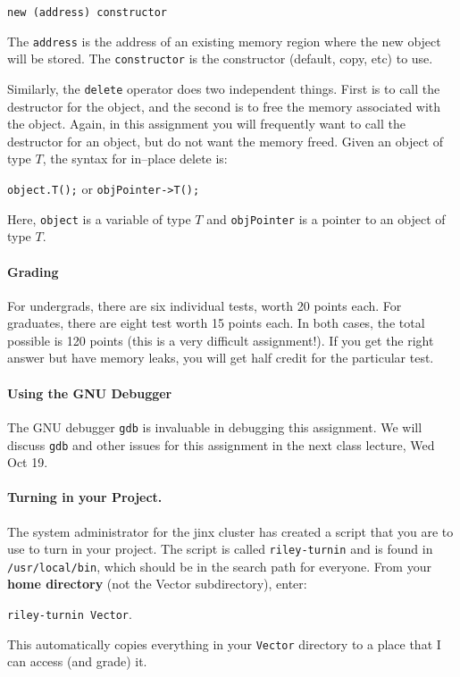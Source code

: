 \documentclass[10pt]{article}
\begin{document}
{\tt new (address) constructor}

The {\tt address} is the address of an existing memory region where
the new object will be stored.  The {\tt constructor} is the
constructor (default, copy, etc) to use.

Similarly, the {\tt delete} operator does two independent things.
First is to call the destructor for the object, and the second is to
free the memory associated with the object.  Again, in this assignment
you will frequently want to call the destructor for an object, but do not
want the memory freed.  Given an object of type $T$, the syntax for
in--place delete is:

{\tt object.T();}  or {\tt objPointer->T();}

Here, {\tt object} is a variable of type $T$ and {\tt objPointer}
is a pointer to an object of type $T$.


\paragraph{Grading}
For undergrads, there are six individual tests, worth 20 points each.
For graduates, there are eight test worth 15 points each. In both 
cases, the total possible is 120 points (this is a very difficult
assignment!).  If you get the right answer but have memory leaks, you
will get half credit for the particular test.

\paragraph{Using the GNU Debugger}
The GNU debugger {\tt gdb} is invaluable in debugging this assignment.
We will discuss {\tt gdb} and other issues for this assignment in the
next class lecture, Wed Oct 19.

\paragraph{Turning in your Project.}
The system administrator for the jinx cluster has created a script
that you are to use to turn in  your project.  The script is called
{\tt riley-turnin} and is found in {\tt /usr/local/bin}, which should
be in the search path for everyone.  From your {\bf home directory}
(not the Vector subdirectory), enter:
\par
{\tt riley-turnin Vector}.
\par
This automatically copies everything in your {\tt Vector}
directory to a place that I can access (and grade) it.
\end{document}
